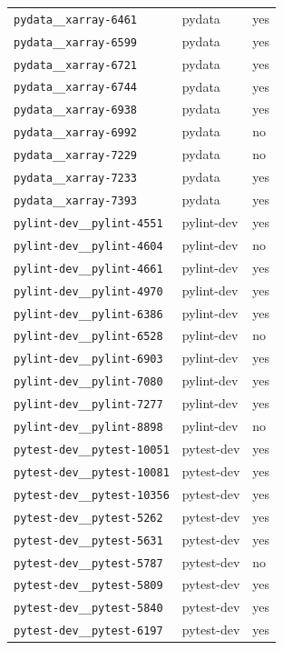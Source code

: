 \begin{longtable}{@{}p{}lp{}@{}}
\texttt{pydata\_\_xarray-6461} & pydata & yes \\
\texttt{pydata\_\_xarray-6599} & pydata & yes \\
\texttt{pydata\_\_xarray-6721} & pydata & yes \\
\texttt{pydata\_\_xarray-6744} & pydata & yes \\
\texttt{pydata\_\_xarray-6938} & pydata & yes \\
\texttt{pydata\_\_xarray-6992} & pydata & no \\
\texttt{pydata\_\_xarray-7229} & pydata & no \\
\texttt{pydata\_\_xarray-7233} & pydata & yes \\
\texttt{pydata\_\_xarray-7393} & pydata & yes \\
\texttt{pylint-dev\_\_pylint-4551} & pylint-dev & yes \\
\texttt{pylint-dev\_\_pylint-4604} & pylint-dev & no \\
\texttt{pylint-dev\_\_pylint-4661} & pylint-dev & yes \\
\texttt{pylint-dev\_\_pylint-4970} & pylint-dev & yes \\
\texttt{pylint-dev\_\_pylint-6386} & pylint-dev & yes \\
\texttt{pylint-dev\_\_pylint-6528} & pylint-dev & no \\
\texttt{pylint-dev\_\_pylint-6903} & pylint-dev & yes \\
\texttt{pylint-dev\_\_pylint-7080} & pylint-dev & yes \\
\texttt{pylint-dev\_\_pylint-7277} & pylint-dev & yes \\
\texttt{pylint-dev\_\_pylint-8898} & pylint-dev & no \\
\texttt{pytest-dev\_\_pytest-10051} & pytest-dev & yes \\
\texttt{pytest-dev\_\_pytest-10081} & pytest-dev & yes \\
\texttt{pytest-dev\_\_pytest-10356} & pytest-dev & yes \\
\texttt{pytest-dev\_\_pytest-5262} & pytest-dev & yes \\
\texttt{pytest-dev\_\_pytest-5631} & pytest-dev & yes \\
\texttt{pytest-dev\_\_pytest-5787} & pytest-dev & no \\
\texttt{pytest-dev\_\_pytest-5809} & pytest-dev & yes \\
\texttt{pytest-dev\_\_pytest-5840} & pytest-dev & yes \\
\texttt{pytest-dev\_\_pytest-6197} & pytest-dev & yes \\

\end{longtable}
